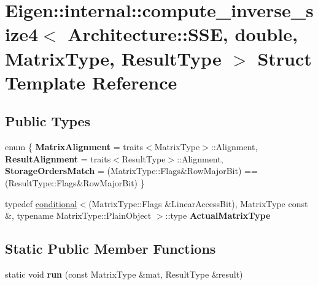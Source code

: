 \hypertarget{struct_eigen_1_1internal_1_1compute__inverse__size4_3_01_architecture_1_1_s_s_e_00_01double_00_0ae07abd87bb6c7ddc3170cf276579ed0}{}\section{Eigen\+::internal\+::compute\+\_\+inverse\+\_\+size4$<$ Architecture\+::S\+SE, double, Matrix\+Type, Result\+Type $>$ Struct Template Reference}
\label{struct_eigen_1_1internal_1_1compute__inverse__size4_3_01_architecture_1_1_s_s_e_00_01double_00_0ae07abd87bb6c7ddc3170cf276579ed0}
\subsection*{Public Types}
\begin{DoxyCompactItemize}
\item 
\mbox{\label{struct_eigen_1_1internal_1_1compute__inverse__size4_3_01_architecture_1_1_s_s_e_00_01double_00_0ae07abd87bb6c7ddc3170cf276579ed0_ab4b98e22e459d7fd22a948f6d14559ff}} 
enum \{ {\bfseries Matrix\+Alignment} = traits$<$Matrix\+Type$>$\+::Alignment, 
{\bfseries Result\+Alignment} = traits$<$Result\+Type$>$\+::Alignment, 
{\bfseries Storage\+Orders\+Match} = (Matrix\+Type\+::Flags\&Row\+Major\+Bit) == (Result\+Type\+::Flags\&Row\+Major\+Bit)
 \}
\item 
\mbox{\label{struct_eigen_1_1internal_1_1compute__inverse__size4_3_01_architecture_1_1_s_s_e_00_01double_00_0ae07abd87bb6c7ddc3170cf276579ed0_a8c192b289cb1e6467ea937d742232706}} 
typedef \mbox{\hyperlink{struct_eigen_1_1internal_1_1conditional}{conditional}}$<$(Matrix\+Type\+::\+Flags \&Linear\+Access\+Bit), Matrix\+Type const \&, typename Matrix\+Type\+::\+Plain\+Object $>$\+::type {\bfseries Actual\+Matrix\+Type}
\end{DoxyCompactItemize}
\subsection*{Static Public Member Functions}
\begin{DoxyCompactItemize}
\item 
\mbox{\label{struct_eigen_1_1internal_1_1compute__inverse__size4_3_01_architecture_1_1_s_s_e_00_01double_00_0ae07abd87bb6c7ddc3170cf276579ed0_a641fad02088ab0ae87dd67428a561e8b}} 
static void {\bfseries run} (const Matrix\+Type \&mat, Result\+Type \&result)
\end{DoxyCompactItemize}


